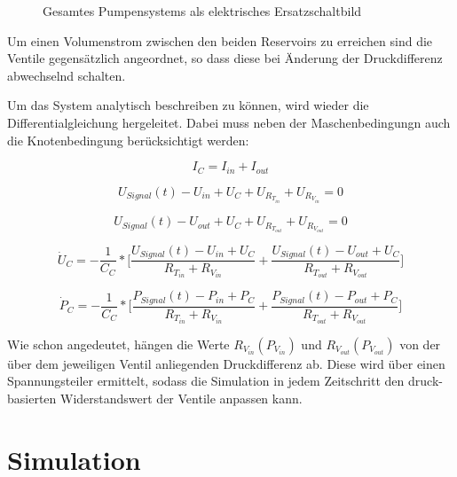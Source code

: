 \documentclass[fontsize=12pt, a4paper]{scrartcl}
\begin{document}
\begin{figure}[H]
	
	\caption{Gesamtes Pumpensystems als elektrisches Ersatzschaltbild}
	\label{fig:systemcircuit}
\end{figure}

Um einen Volumenstrom zwischen den beiden Reservoirs zu erreichen sind die Ventile gegensätzlich angeordnet, so dass diese bei Änderung der Druckdifferenz abwechselnd schalten. 

Um das System analytisch beschreiben zu können, wird wieder die Differentialgleichung hergeleitet. Dabei muss neben der Maschenbedingungn auch die Knotenbedingung berücksichtigt werden:

\begin{equation}
	I_{C} = I_{in} + I_{out}
\end{equation}

\begin{equation}
	U_{Signal}(t) - U_{in} + U_{C} + U_{R_{T_{in}}} + U_{R_{V_{in}}} = 0
\end{equation}

\begin{equation}
	U_{Signal}(t) - U_{out} + U_{C} + U_{R_{T_{out}}} + U_{R_{V_{out}}} = 0
\end{equation}

\begin{equation}
	\dot{U}_{C} = - \frac{1}{C_{C}} * \biggl[\frac{U_{Signal}(t)-U_{in}+U_{C}}{R_{T_{in}}+R_{V_{in}}} + \frac{U_{Signal}(t)-U_{out}+U_{C}}{R_{T_{out}}+R_{V_{out}}}\biggr]
\end{equation}

\begin{equation}
	\dot{P}_{C} = - \frac{1}{C_{C}} * \biggl[\frac{P_{Signal}(t)-P_{in}+P_{C}}{R_{T_{in}}+R_{V_{in}}} + \frac{P_{Signal}(t)-P_{out}+P_{C}}{R_{T_{out}}+R_{V_{out}}}\biggr]
\end{equation}

Wie schon angedeutet, hängen die Werte $R_{V_{in}}(P_{V_{in}})$ und $R_{V_{out}}(P_{V_{out}})$ von der über dem jeweiligen Ventil anliegenden Druckdifferenz ab. Diese wird über einen Spannungsteiler ermittelt, sodass die Simulation in jedem Zeitschritt den druck-basierten Widerstandswert der Ventile anpassen kann.

\section{Simulation}
\end{document}
